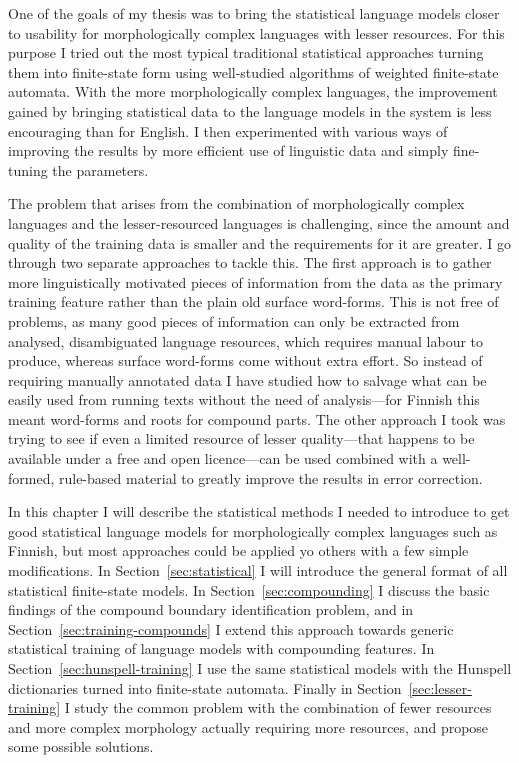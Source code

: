 \documentclass[officiallayout]{unihelcompling}
\begin{document}
One of the goals of my thesis was to bring the statistical language models
closer to usability for morphologically complex languages with lesser
resources. For this purpose I tried out the most typical traditional
statistical approaches turning them into finite-state form using well-studied
algorithms of weighted finite-state automata. With the more morphologically
complex languages, the improvement gained by bringing statistical data to the
language models in the system is less encouraging than for English. I then
experimented with various ways of improving the results by more efficient use
of linguistic data and simply fine-tuning the parameters.

The problem that arises from the combination of morphologically complex
languages and the lesser-resourced languages is challenging, since the amount
and quality of the training data is smaller and the requirements for it are
greater. I go through two separate approaches to tackle this. The first
approach is to gather more linguistically motivated pieces of information from
the data as the primary training feature rather than the plain old surface
word-forms. This is not free of problems, as many good pieces of information
can only be extracted from analysed, disambiguated language resources,
which requires manual labour to produce, whereas surface word-forms
come without extra effort. So instead of requiring manually annotated data I
have studied how to salvage what can be easily used from running texts without
the need of analysis---for Finnish this meant word-forms and roots for compound
parts. The other approach I took was trying to see if even a limited
resource of lesser quality---that happens to be available under a free and open
licence---can be used combined with a well-formed, rule-based material to
greatly improve the results in error correction.

In this chapter I will describe the statistical methods I needed to introduce
to get good statistical language models for morphologically complex languages
such as Finnish, but most approaches could be applied yo others with a
few simple modifications. In Section~\ref{sec:statistical} I will introduce the
general format of all statistical finite-state models.  In
Section~\ref{sec:compounding} I discuss the basic findings of the compound boundary
identification problem, and in Section~\ref{sec:training-compounds} I extend
this approach towards generic statistical training of language models with
compounding features. In Section~\ref{sec:hunspell-training} I use the same
statistical models with the Hunspell dictionaries turned into finite-state
automata. Finally in Section~\ref{sec:lesser-training} I study the common
problem with the combination of fewer resources and more complex morphology
actually requiring more resources, and propose some possible solutions.
\end{document}
